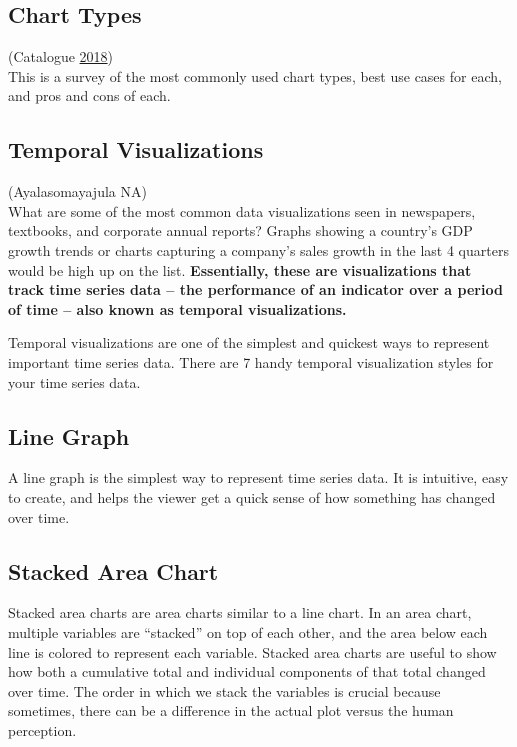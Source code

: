 \documentclass[]{book}
\begin{document}
\subsection{Chart Types}\label{chart-types}

(Catalogue \protect\hyperlink{ref-charts_viz}{2018})\\
This is a survey of the most commonly used chart types, best use cases
for each, and pros and cons of each.

\subsection{Temporal Visualizations}\label{temporal-visualizations}

(Ayalasomayajula NA)\\
What are some of the most common data visualizations seen in newspapers,
textbooks, and corporate annual reports? Graphs showing a country's GDP
growth trends or charts capturing a company's sales growth in the last 4
quarters would be high up on the list. \textbf{Essentially, these are
visualizations that track time series data -- the performance of an
indicator over a period of time -- also known as temporal
visualizations.}

Temporal visualizations are one of the simplest and quickest ways to
represent important time series data. There are 7 handy temporal
visualization styles for your time series data.

\subsection{Line Graph}\label{line-graph}

A line graph is the simplest way to represent time series data. It is
intuitive, easy to create, and helps the viewer get a quick sense of how
something has changed over time.

\subsection{Stacked Area Chart}\label{stacked-area-chart}

Stacked area charts are area charts similar to a line chart. In an area
chart, multiple variables are ``stacked'' on top of each other, and the
area below each line is colored to represent each variable. Stacked area
charts are useful to show how both a cumulative total and individual
components of that total changed over time. The order in which we stack
the variables is crucial because sometimes, there can be a difference in
the actual plot versus the human perception.
\end{document}

